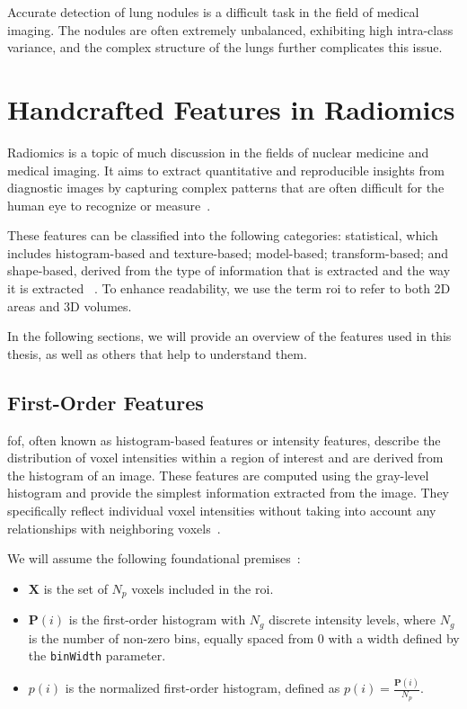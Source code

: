 Accurate detection of lung nodules is a difficult task in the field of medical imaging. The nodules are often extremely unbalanced, exhibiting high intra-class variance, and the complex structure of the lungs further complicates this issue.


\section{Handcrafted Features in Radiomics}\label{sec_features}

Radiomics is a topic of much discussion in the fields of nuclear medicine and medical imaging. It aims to extract quantitative and reproducible insights from diagnostic images by capturing complex patterns that are often difficult for the human eye to recognize or measure~\cite{cantatore_introduction_2011}.

These features can be classified into the following categories: statistical, which includes histogram-based and texture-based; model-based; transform-based; and shape-based, derived from the type of information that is extracted and the way it is extracted
~\cite{cantatore_introduction_2011, abbasian_ardakani_interpretation_2022}.
To enhance readability, we use the term \ac{roi} to refer to both 2D areas and 3D volumes.

In the following sections, we will provide an overview of the features used in this thesis, as well as others that help to understand them.

\subsection{First-Order Features}

\acf{fof}, often known as histogram-based features or intensity features, describe the distribution of voxel intensities within a region of interest and are derived from the histogram of an image. These features are computed using the gray-level histogram and provide the simplest information extracted from the image. They specifically reflect individual voxel intensities without taking into account any relationships with neighboring voxels~\cite{abbasian_ardakani_interpretation_2022}.

We will assume the following foundational premises~\cite{van_griethuysen_computational_2017}:
\begin{itemize}
  \item $\mathbf{X}$ is the set of $N_p$ voxels included in the \ac{roi}.
  \item $\mathbf{P}(i)$ is the first-order histogram with $N_g$ discrete intensity levels, where $N_g$ is the number of non-zero bins, equally spaced from 0 with a width defined by the \texttt{binWidth} parameter.
  \item $p(i)$ is the normalized first-order histogram, defined as $p(i) = \frac{\mathbf{P}(i)}{N_p}$.
\end{itemize}

